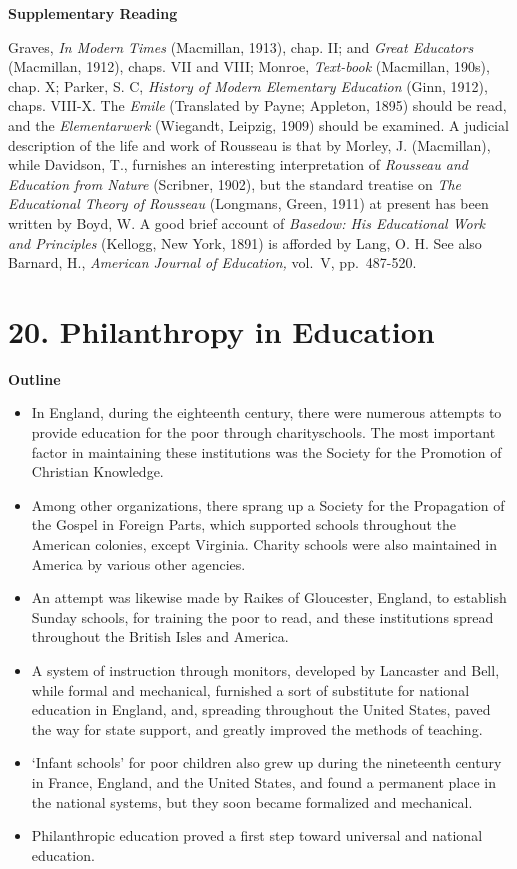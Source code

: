 \documentclass[]{book}
\providecommand{\tightlist}{%
  \setlength{\itemsep}{0pt}\setlength{\parskip}{0pt}}
\begin{document}
\textbf{Supplementary Reading}

Graves, \emph{In Modern Times} (Macmillan, 1913), chap. II; and \emph{Great Educators} (Macmillan, 1912), chaps. VII and VIII; Monroe, \emph{Text-book} (Macmillan, 190s), chap. X; Parker, S. C, \emph{History of Modern Elementary Education} (Ginn, 1912), chaps. VIII-X. The \emph{Emile} (Translated by Payne; Appleton, 1895) should be read, and the \emph{Elementarwerk} (Wiegandt, Leipzig, 1909) should be examined. A judicial description of the life and work of Rousseau is that by Morley, J. (Macmillan), while Davidson, T., furnishes an interesting interpretation of \emph{Rousseau and Education from Nature} (Scribner, 1902), but the standard treatise on \emph{The Educational Theory of Rousseau} (Longmans, Green, 1911) at present has been written by Boyd, W. A good brief account of \emph{Basedow: His Educational Work and Principles} (Kellogg, New York, 1891) is afforded by Lang, O. H. See also Barnard, H., \emph{American Journal of Education,} vol.~V, pp.~487-520.

\hypertarget{philanthropy-in-education}{%
\chapter{20. Philanthropy in Education}\label{philanthropy-in-education}}

\textbf{Outline}

\begin{itemize}
\tightlist
\item
  In England, during the eighteenth century, there were numerous attempts to provide education for the poor through charityschools. The most important factor in maintaining these institutions was the Society for the Promotion of Christian Knowledge.
\item
  Among other organizations, there sprang up a Society for the Propagation of the Gospel in Foreign Parts, which supported schools throughout the American colonies, except Virginia. Charity schools were also maintained in America by various other agencies.
\item
  An attempt was likewise made by Raikes of Gloucester, England, to establish Sunday schools, for training the poor to read, and these institutions spread throughout the British Isles and America.
\item
  A system of instruction through monitors, developed by Lancaster and Bell, while formal and mechanical, furnished a sort of substitute for national education in England, and, spreading throughout the United States, paved the way for state support, and greatly improved the methods of teaching.
\item
  `Infant schools' for poor children also grew up during the nineteenth century in France, England, and the United States, and found a permanent place in the national systems, but they soon became formalized and mechanical.
\item
  Philanthropic education proved a first step toward universal and national education.
\end{itemize}
\end{document}
